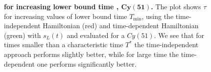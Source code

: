 \begin{figure}[ht]
  \centering
  \caption{\textbf{\bm{$\tau$} for increasing lower bound time , $\bm{Cy(51)}$.} The plot shows $\tau$ for increasing values of lower bound time $T_{\min}$, using the time-independent Hamiltonian (red) and time-dependent Hamiltonian (green) with $s_L(t)$ and evaluated for a $Cy(51)$. We see that for times smaller than a characteristic time $T^*$ the time-independent approach performs slightly better, while for large time the time-dependent one performs significantly better.}
  \label{fig:tau_increasing_time}
\end{figure}
